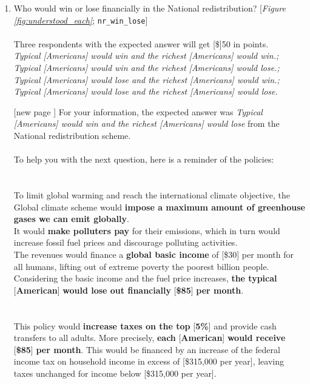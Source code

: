 \begin{enumerate}[resume]
\item  \label{q:understood_nr} Who would win or lose financially in the National redistribution? [\textit{Figure \ref{fig:understood_each}}; \verb|nr_win_lose|] ~\\
\\
Three respondents with the expected answer will get [\$]50 in points.
\\ \textit{Typical [Americans] would win and the richest [Americans] would win.; Typical [Americans] would win and the richest [Americans] would lose.; Typical [Americans] would lose and the richest [Americans] would win.; Typical [Americans] would lose and the richest [Americans] would lose.}
\item[[new page\!\!\!]] For your information, the expected answer was \textit{Typical [Americans] would win and the richest [Americans] would lose} from the National redistribution scheme. \\ 
\\
To help you with the next question, here is a reminder of the policies:\\
\\
\textbf{}\\ 
To limit global warming and reach the international climate objective, the Global climate scheme would \textbf{impose a maximum amount of greenhouse gases we can emit globally}.\\
It would \textbf{make polluters pay} for their emissions, which in turn would increase fossil fuel prices and discourage polluting activities.\\
The revenues would finance a \textbf{global basic income} of [\$30] per month for all humans, lifting out of extreme poverty the poorest billion people.\\
Considering the basic income and the fuel price increases, \textbf{the typical }[\textbf{American}]\textbf{ would lose out financially }[\textbf{\$85}]\textbf{ per month}.\\
\\
\textbf{} \\This policy would \textbf{increase taxes on the top }[\textbf{5\%}] and provide cash transfers to all adults. More precisely, \textbf{each }[\textbf{American}]\textbf{ would receive }[\textbf{\$85}]\textbf{ per month}. This would be financed by an increase of the federal income tax on household income in excess of [\$315,000 per year], leaving taxes unchanged for income below [\$315,000 per year].

\end{enumerate}
